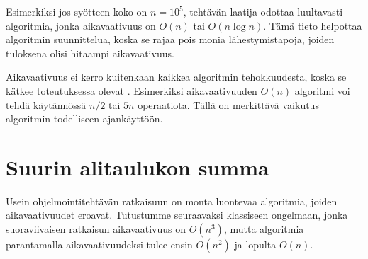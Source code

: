 Esimerkiksi jos syötteen koko on $n=10^5$,
tehtävän laatija odottaa luultavasti
algoritmia, jonka aikavaativuus on $O(n)$ tai $O(n \log n)$.
Tämä tieto helpottaa algoritmin suunnittelua,
koska se rajaa pois monia lähestymistapoja,
joiden tuloksena olisi hitaampi aikavaativuus.


Aikavaativuus ei kerro kuitenkaan kaikkea algoritmin
tehokkuudesta, koska se kätkee toteutuksessa olevat
. Esimerkiksi aikavaativuuden $O(n)$
algoritmi voi tehdä käytännössä $n/2$ tai $5n$ operaatiota.
Tällä on merkittävä vaikutus algoritmin
todelliseen ajankäyttöön.

\section{Suurin alitaulukon summa}


Usein ohjelmointitehtävän ratkaisuun on monta
luontevaa algoritmia, joiden aikavaativuudet eroavat.
Tutustumme seuraavaksi klassiseen ongelmaan,
jonka suoraviivaisen ratkaisun aikavaativuus on $O(n^3)$,
mutta algoritmia parantamalla aikavaativuudeksi
tulee ensin $O(n^2)$ ja lopulta $O(n)$.

